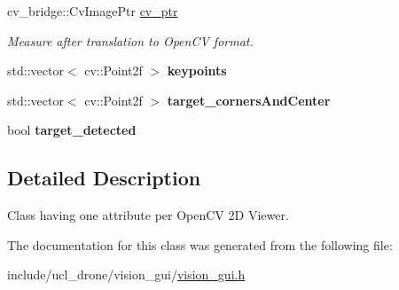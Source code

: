 \begin{DoxyCompactItemize}
\mbox{\label{classVisionGui_ad85345558f85debe1047590b12caa045}} 
cv\+\_\+bridge\+::\+Cv\+Image\+Ptr \hyperlink{classVisionGui_ad85345558f85debe1047590b12caa045}{cv\+\_\+ptr}
\begin{DoxyCompactList}\small\item\em Measure after translation to Open\+CV format. \end{DoxyCompactList}\item 
\mbox{\label{classVisionGui_aaf51140acd73d436b9fbc1d0acecf167}} 
std\+::vector$<$ cv\+::\+Point2f $>$ {\bfseries keypoints}
\item 
\mbox{\label{classVisionGui_a5a39bb5cf028158ef12c8dbfaa85e881}} 
std\+::vector$<$ cv\+::\+Point2f $>$ {\bfseries target\+\_\+corners\+And\+Center}
\item 
\mbox{\label{classVisionGui_a399fac134b4485ad24ba48c2d49381c9}} 
bool {\bfseries target\+\_\+detected}
\end{DoxyCompactItemize}


\subsection{Detailed Description}
Class having one attribute per Open\+CV 2D Viewer. 

The documentation for this class was generated from the following file\+:\begin{DoxyCompactItemize}
\item 
include/ucl\+\_\+drone/vision\+\_\+gui/\hyperlink{vision__gui_8h}{vision\+\_\+gui.\+h}\end{DoxyCompactItemize}
